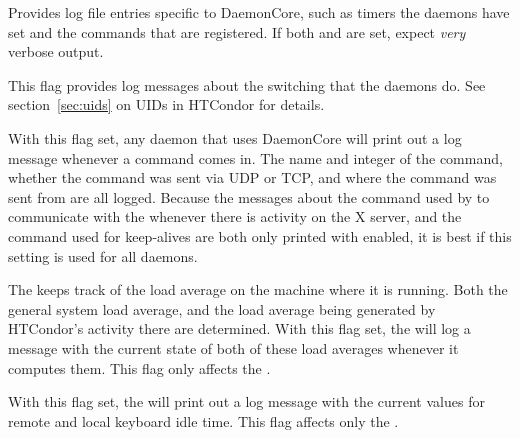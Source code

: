 \begin{description}
\begin{description}
  \label{dflag:daemoncore} 
  \item[\Dflag{DAEMONCORE}]
    Provides log
    file entries specific to DaemonCore, such as
    timers the daemons have set and the commands that are registered.
    If both  and  are set,
    expect \emph{very} verbose output.

  \label{dflag:priv}
  \item[\Dflag{PRIV}]
    This flag provides log
    messages about the  switching that the daemons
    do.  See section~\ref{sec:uids} on UIDs in HTCondor for details.

  \label{dflag:command}
  \item[\Dflag{COMMAND}]
    With this flag set, any
    daemon that uses DaemonCore will print out a log message
    whenever a command comes in.  The name and integer of the command,
    whether the command was sent via UDP or TCP, and where
    the command was sent from are all logged.  
    Because the messages about the command used by  to
    communicate with the  whenever there is activity on
    the X server, and the command used for keep-alives are both only
    printed with  enabled, it is best if this setting
    is used for all daemons.

  \label{dflag:load}
  \item[\Dflag{LOAD}]
    The  keeps track
    of the load average on the machine where it is running.  Both the
    general system load average, and the load average being generated by
    HTCondor's activity there are determined.
    With this flag set, the 
    will log a message with the current state of both of these
    load averages whenever it computes them.  This flag only affects the
    .

  \label{dflag:keyboard} 
  \item[\Dflag{KEYBOARD}]
    With this flag set, the  will print out a log message
    with the current values for remote and local keyboard idle time.
    This flag affects only the .


\end{description}
\end{description}
